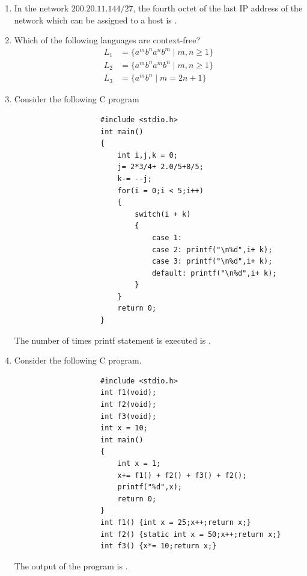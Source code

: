 \documentclass[journal,12pt,onecolumn]{IEEEtran}
\theoremstyle{remark}
\begin{document}
\begin{enumerate}
				\hfill{}
				
				\item In the network $200.20.11.144/27$, the fourth octet  of the last IP address of the network which can be assigned to a host is \underline{\hspace{2cm}}.
				
				\hfill{}
				
				\item Which of the following languages are context-free?
				\begin{align*}
					L_1 &= \{a^m b^n a^n b^m \mid m, n \geq 1\}\\
					L_2 &= \{a^m b^n a^m b^n \mid m, n \geq 1\}\\
					L_3 &= \{a^m b^n \mid m = 2n + 1\}
				\end{align*}
				
				\hfill{}
				
				\begin{enumerate}
				\end{enumerate}
				
				\item Consider the following C program
				\begin{verbatim}
					#include <stdio.h>
					int main()
					{
						int i,j,k = 0;
						j= 2*3/4+ 2.0/5+8/5;
						k-= --j;
						for(i = 0;i < 5;i++)
						{
							switch(i + k)
							{
								case 1:
								case 2: printf("\n%d",i+ k);
								case 3: printf("\n%d",i+ k);
								default: printf("\n%d",i+ k);
							}
						}
						return 0;
					}
				\end{verbatim}
				The number of times printf statement is executed is \underline{\hspace{2cm}}.
				
				\hfill{}
				
				\item Consider the following C program.
				\begin{verbatim}
					#include <stdio.h>
					int f1(void);
					int f2(void);
					int f3(void);
					int x = 10;
					int main()
					{
						int x = 1;
						x+= f1() + f2() + f3() + f2();
						printf("%d",x);
						return 0;
					}
					int f1() {int x = 25;x++;return x;}
					int f2() {static int x = 50;x++;return x;}
					int f3() {x*= 10;return x;}
				\end{verbatim}
				The output of the program is \underline{\hspace{2cm}}.
				

\end{enumerate}
\end{document}
